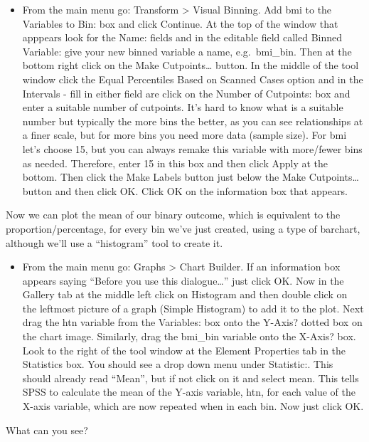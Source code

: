 \documentclass[
]{book}
\providecommand{\tightlist}{%
  \setlength{\itemsep}{0pt}\setlength{\parskip}{0pt}}
\begin{document}
\begin{itemize}
\tightlist
\item
  From the main menu go: Transform \textgreater{} Visual Binning. Add bmi to the Variables to Bin: box and click Continue. At the top of the window that apppears look for the Name: fields and in the editable field called Binned Variable: give your new binned variable a name, e.g.~bmi\_bin. Then at the bottom right click on the Make Cutpoints\ldots{} button. In the middle of the tool window click the Equal Percentiles Based on Scanned Cases option and in the Intervals - fill in either field are click on the Number of Cutpoints: box and enter a suitable number of cutpoints. It's hard to know what is a suitable number but typically the more bins the better, as you can see relationships at a finer scale, but for more bins you need more data (sample size). For bmi let's choose 15, but you can always remake this variable with more/fewer bins as needed. Therefore, enter 15 in this box and then click Apply at the bottom. Then click the Make Labels button just below the Make Cutpoints\ldots{} button and then click OK. Click OK on the information box that appears.
\end{itemize}

Now we can plot the mean of our binary outcome, which is equivalent to the proportion/percentage, for every bin we've just created, using a type of barchart, although we'll use a ``histogram'' tool to create it.

\begin{itemize}
\tightlist
\item
  From the main menu go: Graphs \textgreater{} Chart Builder. If an information box appears saying ``Before you use this dialogue\ldots{}'' just click OK. Now in the Gallery tab at the middle left click on Histogram and then double click on the leftmost picture of a graph (Simple Histogram) to add it to the plot. Next drag the htn variable from the Variables: box onto the Y-Axis? dotted box on the chart image. Similarly, drag the bmi\_bin variable onto the X-Axis? box. Look to the right of the tool window at the Element Properties tab in the Statistics box. You should see a drop down menu under Statistic:. This should already read ``Mean'', but if not click on it and select mean. This tells SPSS to calculate the mean of the Y-axis variable, htn, for each value of the X-axis variable, which are now repeated when in each bin. Now just click OK.
\end{itemize}

What can you see?
\end{document}

